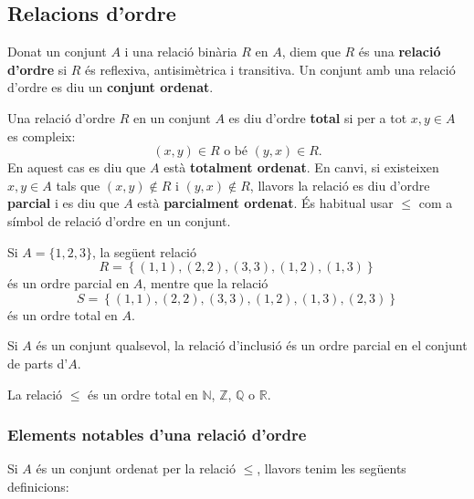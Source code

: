 \subsection{Relacions d'ordre}

Donat un conjunt $A$ i una relació binària $R$ en $A$, diem que $R$
és una \textbf{relació d'ordre} si $R$ és reflexiva, antisimètrica i transitiva. Un conjunt amb una relació d'ordre es diu un \textbf{%
conjunt ordenat}.

Una relació d'ordre $R$ en un conjunt $A$ es diu d'ordre \textbf{total}
si per a tot $x,y\in A$ es compleix:%
\begin{equation*}
(x,y)\in R\text{ \ \ o bé \ \ }(y,x)\in R\text{.}
\end{equation*}
En aquest cas es diu que $A$ està \textbf{totalment ordenat}. En canvi,
si existeixen $x,y\in A$ tals que $(x,y)\notin R$ i $(y,x)\notin R$, llavors
la relació es diu d'ordre \textbf{parcial} i es diu que $A$ està
\textbf{parcialment ordenat}. És habitual usar $\leq$ com a símbol
de relació d'ordre en un conjunt.

\begin{exemple}
Si $A=\{1,2,3\}$, la següent relació%
\begin{equation*}
R=\left\{ (1,1),(2,2),(3,3),(1,2),(1,3)\right\}
\end{equation*}
és un ordre parcial en $A$, mentre que la relació%
\begin{equation*}
S=\left\{ (1,1),(2,2),(3,3),(1,2),(1,3),(2,3)\right\}
\end{equation*}
és un ordre total en $A$.
\end{exemple}

\begin{exemple}
Si $A$ és un conjunt qualsevol, la relació d'inclusió és un
ordre parcial en el conjunt de parts d'$A$.
\end{exemple}

\begin{exemple}
La relació $\leq$ és un ordre total en $\mathbb{N}$, $\mathbb{Z}$, $%
\mathbb{Q}$ o $\mathbb{R}$.
\end{exemple}

\subsubsection{Elements notables d'una relació d'ordre}

Si $A$ és un conjunt ordenat per la relació $\leq$, llavors tenim
les següents definicions:

